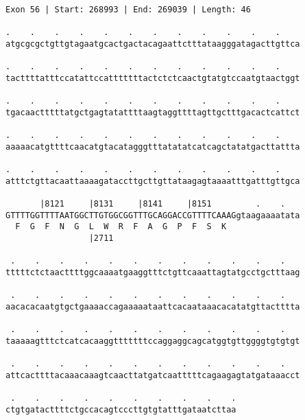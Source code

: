 \documentclass{article}
\begin{document}
\newpage
\begin{Verbatim}
Exon 56 | Start: 268993 | End: 269039 | Length: 46
 
.    .    .    .    .    .    .    .    .    .    .    .    
atgcgcgctgttgtagaatgcactgactacagaattctttataagggatagacttgttca
  
.    .    .    .    .    .    .    .    .    .    .    .    
tacttttatttccatattccatttttttactctctcaactgtatgtccaatgtaactggt
  
.    .    .    .    .    .    .    .    .    .    .    .    
tgacaactttttatgctgagtatattttaagtaggttttagttgctttgacactcattct
  
.    .    .    .    .    .    .    .    .    .    .    .    
aaaaacatgttttcaacatgtacatagggtttatatatcatcagctatatgacttattta
  
.    .    .    .    .    .    .    .    .    .    .    .    
atttctgttacaattaaaagataccttgcttgttataagagtaaaatttgatttgttgca
  
       |8121     |8131     |8141     |8151         .    .   
GTTTTGGTTTTAATGGCTTGTGGCGGTTTGCAGGACCGTTTTCAAAGgtaagaaaatata
  F  G  F  N  G  L  W  R  F  A  G  P  F  S  K               
                 |2711                                      
  
 .    .    .    .    .    .    .    .    .    .    .    .   
tttttctctaacttttggcaaaatgaaggtttctgttcaaattagtatgcctgctttaag
  
 .    .    .    .    .    .    .    .    .    .    .    .   
aacacacaatgtgctgaaaaccagaaaaataattcacaataaacacatatgttactttta
  
 .    .    .    .    .    .    .    .    .    .    .    .   
taaaaagtttctcatcacaaggtttttttccaggaggcagcatggtgttggggtgtgtgt
  
 .    .    .    .    .    .    .    .    .    .    .    .   
attcacttttacaaacaaagtcaacttatgatcaatttttcagaagagtatgataaacct
  
 .    .    .    .    .    .    .    .    .    .
ctgtgatacttttctgccacagtcccttgtgtatttgataatcttaa
\end{Verbatim}
\newpage
\end{document}
